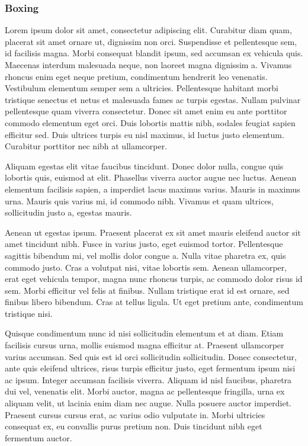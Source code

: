 \subsubsection{Boxing}
\label{subsec:botsbasicos:boxing}
Lorem ipsum dolor sit amet, consectetur adipiscing elit. Curabitur diam quam, placerat sit amet ornare ut, dignissim non orci. Suspendisse et pellentesque sem, id facilisis magna. Morbi consequat blandit ipsum, sed accumsan ex vehicula quis. Maecenas interdum malesuada neque, non laoreet magna dignissim a. Vivamus rhoncus enim eget neque pretium, condimentum hendrerit leo venenatis. Vestibulum elementum semper sem a ultricies. Pellentesque habitant morbi tristique senectus et netus et malesuada fames ac turpis egestas. Nullam pulvinar pellentesque quam viverra consectetur. Donec sit amet enim eu ante porttitor commodo elementum eget orci. Duis lobortis mattis nibh, sodales feugiat sapien efficitur sed. Duis ultrices turpis eu nisl maximus, id luctus justo elementum. Curabitur porttitor nec nibh at ullamcorper.

Aliquam egestas elit vitae faucibus tincidunt. Donec dolor nulla, congue quis lobortis quis, euismod at elit. Phasellus viverra auctor augue nec luctus. Aenean elementum facilisis sapien, a imperdiet lacus maximus varius. Mauris in maximus urna. Mauris quis varius mi, id commodo nibh. Vivamus et quam ultrices, sollicitudin justo a, egestas mauris.

Aenean ut egestas ipsum. Praesent placerat ex sit amet mauris eleifend auctor sit amet tincidunt nibh. Fusce in varius justo, eget euismod tortor. Pellentesque sagittis bibendum mi, vel mollis dolor congue a. Nulla vitae pharetra ex, quis commodo justo. Cras a volutpat nisi, vitae lobortis sem. Aenean ullamcorper, erat eget vehicula tempor, magna nunc rhoncus turpis, ac commodo dolor risus id sem. Morbi efficitur vel felis at finibus. Nullam tristique erat id est ornare, sed finibus libero bibendum. Cras at tellus ligula. Ut eget pretium ante, condimentum tristique nisi.

Quisque condimentum nunc id nisi sollicitudin elementum et at diam. Etiam facilisis cursus urna, mollis euismod magna efficitur at. Praesent ullamcorper varius accumsan. Sed quis est id orci sollicitudin sollicitudin. Donec consectetur, ante quis eleifend ultrices, risus turpis efficitur justo, eget fermentum ipsum nisi ac ipsum. Integer accumsan facilisis viverra. Aliquam id nisl faucibus, pharetra dui vel, venenatis elit. Morbi auctor, magna ac pellentesque fringilla, urna ex aliquam velit, ut lacinia enim diam nec augue. Nulla posuere auctor imperdiet. Praesent cursus cursus erat, ac varius odio vulputate in. Morbi ultricies consequat ex, eu convallis purus pretium non. Duis tincidunt nibh eget fermentum auctor.



